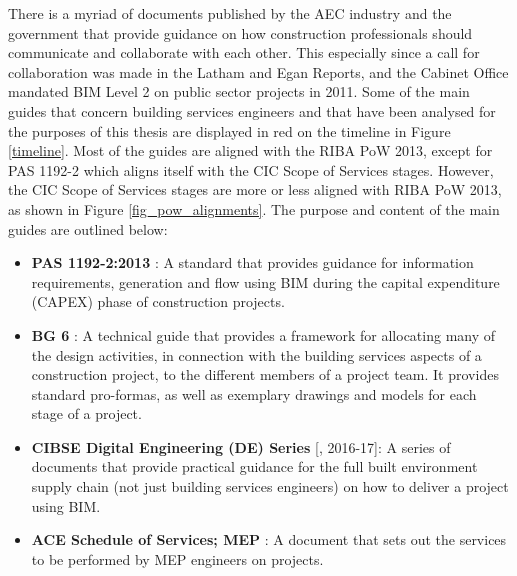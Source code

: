 There is a myriad of documents published by the AEC industry and the government that provide guidance on how construction professionals should communicate and collaborate with each other.
This especially since a call for collaboration was made in the Latham and Egan Reports, and the Cabinet Office mandated BIM Level 2 on public sector projects in 2011.
Some of the main guides that concern building services engineers and that have been analysed for the purposes of this thesis are displayed in red on the timeline in Figure \ref{timeline}.
Most of the guides are aligned with the RIBA PoW 2013, except for PAS 1192-2 which aligns itself with the CIC Scope of Services stages.
However, the CIC Scope of Services stages are more or less aligned with RIBA PoW 2013, as shown in Figure \ref{fig_pow_alignments}.
The purpose and content of the main guides are outlined below:
\begin{itemize}
    \item \textbf{PAS 1192-2:2013} \citep{PAS1192}: A standard that provides guidance for information requirements, generation and flow using BIM during the capital expenditure (CAPEX) phase of construction projects.
    \item \textbf{BG 6} \citep{BG62014}: 
    A technical guide that provides a framework for allocating many of the design activities, in connection with the building services aspects of a construction project, to the different members of a project team. It provides standard pro-formas, as well as exemplary drawings and models for each stage of a project.
    \item \textbf{CIBSE Digital Engineering (DE) Series} [\citeauthor{DE2}, 2016-17]: A series of documents that provide practical guidance for the full built environment supply chain (not just building services engineers) on how to deliver a project using BIM.
    \item \textbf{ACE Schedule of Services; MEP} \citep{ACE2017}: A document that sets out the services to be performed by MEP engineers on projects.
\end{itemize}


